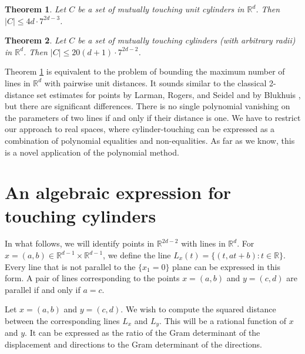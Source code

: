 \documentclass[letterpaper, reqno, 11pt]{article}
\numberwithin{equation}{section}
\newcommand{\RR}{\mathbb{R}}
\newtheorem{thm}{Theorem}[section]
\theoremstyle{remark}
\begin{document}
\begin{thm}\label{unitDistanceLines}
Let $C$ be a set of mutually touching unit cylinders in $\RR^d$. Then $|C|\leq 4d\cdot 7^{2d-3}$.
\end{thm}
\begin{thm}\label{unitDistanceCylindersLines}
Let $C$ be a set of mutually touching cylinders (with arbitrary radii) in $\RR^d$. Then $|C|\leq 20(d+1)\cdot 7^{2d-2}$.
\end{thm}

Theorem \ref{unitDistanceLines} is equivalent to the problem of bounding the maximum number of lines in $\mathbb{R}^d$ with pairwise unit distances. It sounds similar to the classical 2-distance set estimates for points by Larman, Rogers, and Seidel \cite{LarmanRogersSeidel1977} and by Blukhuis \cite{Blokhuis1988}, but there are significant differences. There is no single polynomial vanishing on the parameters of two lines if and only if their distance is one. We have to restrict our approach to real spaces, where cylinder-touching can be expressed as a combination of polynomial equalities and non-equalities. As far as we know, this is a novel application of the polynomial method.


\section{An algebraic expression for touching cylinders}\label{algExpressionForTangencySection}
In what follows, we will identify points in $\RR^{2d-2}$ with lines in $\RR^d$. For $x = (a,b)\in\RR^{d-1}\times\RR^{d-1}$, we define the line $L_{x}(t) = \{(t, at+b)\colon t\in\RR\}$. Every line that is not parallel to the $\{x_1=0\}$ plane can be expressed in this form. A pair of lines corresponding to the points $x=(a,b)$ and $y=(c,d)$ are parallel if and only if $a=c$. 

Let $x=(a,b)$ and $y=(c,d)$. We wish to compute the squared distance between the corresponding lines $L_x$ and $L_{y}$. This will be a rational function of $x$ and $y$. It can be expressed as the ratio of the Gram determinant of the displacement and directions to the Gram determinant of the directions.
\end{document}
